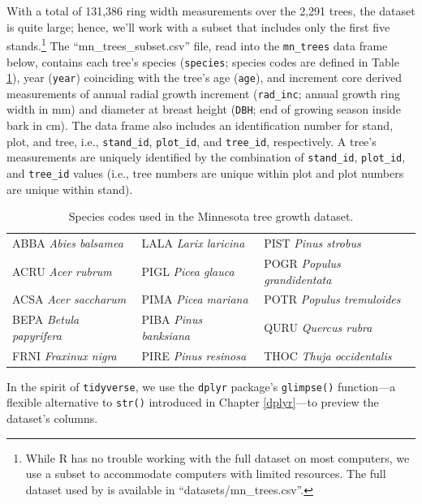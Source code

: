 \documentclass[
  11pt,
]{krantz}
\theoremstyle{definition}
\theoremstyle{definition}
\theoremstyle{definition}
\theoremstyle{definition}
\theoremstyle{remark}
\begin{document}
With a total of 131,386 ring width measurements over the 2,291 trees, the dataset is quite large; hence, we'll work with a subset that includes only the first five stands.\footnote{While R has no trouble working with the full dataset on most computers, we use a subset to accommodate computers with limited resources. The full dataset used by \citet{itter2017} is available in ``datasets/mn\_trees.csv''.} The ``mn\_trees\_subset.csv'' file, read into the \texttt{mn\_trees} data frame below, contains each tree's species (\texttt{species}; species codes are defined in Table \ref{tab:sppCodes}), year (\texttt{year}) coinciding with the tree's age (\texttt{age}), and increment core derived measurements of annual radial growth increment (\texttt{rad\_inc}; annual growth ring width in mm) and diameter at breast height (\texttt{DBH}; end of growing season inside bark in cm). The data frame also includes an identification number for stand, plot, and tree, i.e., \texttt{stand\_id}, \texttt{plot\_id}, and \texttt{tree\_id}, respectively. A tree's measurements are uniquely identified by the combination of \texttt{stand\_id}, \texttt{plot\_id}, and \texttt{tree\_id} values (i.e., tree numbers are unique within plot and plot numbers are unique within stand).

\begin{table}[!h]

\caption{\label{tab:sppCodes}Species codes used in the Minnesota tree growth dataset.}
\centering
\fontsize{11}{13}\selectfont
\begin{tabular}[t]{lll}
\toprule
ABBA \emph{Abies balsamea} & LALA \emph{Larix laricina} & PIST \emph{Pinus strobus}\\
\addlinespace
ACRU \emph{Acer rubrum} & PIGL \emph{Picea glauca} & POGR \emph{Populus grandidentata}\\
\addlinespace
ACSA \emph{Acer saccharum} & PIMA \emph{Picea mariana} & POTR \emph{Populus tremuloides}\\
\addlinespace
BEPA \emph{Betula papyrifera} & PIBA \emph{Pinus banksiana} & QURU \emph{Quercus rubra}\\
\addlinespace
FRNI \emph{Fraxinux nigra} & PIRE \emph{Pinus resinosa} & THOC \emph{Thuja occidentalis}\\
\bottomrule
\end{tabular}
\end{table}

In the spirit of \texttt{tidyverse}, we use the \texttt{dplyr} package's \texttt{glimpse()} function---a flexible alternative to \texttt{str()} introduced in Chapter \ref{dplyr}---to preview the dataset's columns.
\end{document}
